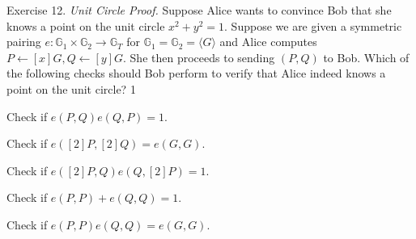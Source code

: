 \documentclass[../lecture-notes-148x210.tex]{subfiles}
\begin{document}
\begin{xexercise}
    {Exercise 12.}
    {\textit{Unit Circle Proof.} Suppose Alice wants to convince Bob that she knows a point on the unit circle $x^2+y^2=1$. Suppose we are given a symmetric pairing $e: \mathbb{G}_1 \times \mathbb{G}_2 \to \mathbb{G}_T$ for $\mathbb{G}_1=\mathbb{G}_2=\langle G \rangle$ and Alice computes $P \gets [x]G, Q \gets [y]G$. She then proceeds to sending $(P,Q)$ to Bob. Which of the following checks should Bob perform to verify that Alice indeed knows a point on the unit circle?}
    {1}
    {
        \item Check if $e(P,Q)e(Q,P)=1$.
        \item Check if $e([2]P,[2]Q) = e(G,G)$.
        \item Check if $e([2]P,Q)e(Q,[2]P) = 1$.
        \item Check if $e(P,P)+e(Q,Q) = 1$.
        \item Check if $e(P,P)e(Q,Q)=e(G,G)$.
    }
\end{xexercise}
\end{document}
